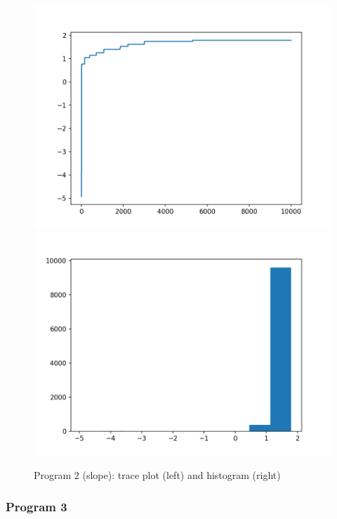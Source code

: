 \documentclass[12pt]{article}%
\theoremstyle{definition}
\begin{document}
	\begin{figure}[h]
	\centering
	\includegraphics[scale=0.4]{p2traceplot_slope.png}
	\includegraphics[scale=0.4]{p2histogram_slope.png}
	\caption{Program 2 (slope): trace plot (left) and histogram (right)}
	\end{figure}
		
	
		
	\subsubsection{Program 3}
	
\end{document}

